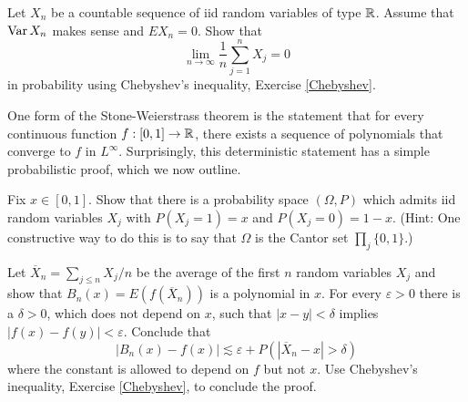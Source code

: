 \begin{exercise}
Let $X_n$ be a countable sequence of iid random variables of type $\mathbb{R}$.
Assume that $\operatorname{Var} X_n$ makes sense and $EX_n = 0$. Show that
$$\lim_{n \to \infty} \frac{1}{n} \sum_{j=1}^n X_j = 0$$
in probability using Chebyshev's inequality, Exercise \ref{Chebyshev}.
\end{exercise}

\begin{exercise}
One form of the Stone-Weierstrass theorem is the statement that for every continuous function $f: [0, 1] \to \mathbb{R}$, there exists a sequence of polynomials that converge to $f$ in $L^\infty$.
Surprisingly, this deterministic statement has a simple probabilistic proof, which we now outline.

Fix $x \in [0, 1]$.
Show that there is a probability space $(\Omega, P)$ which admits iid random variables $X_j$ with $P(X_j = 1) = x$ and $P(X_j = 0) = 1 - x$.
(Hint: One constructive way to do this is to say that $\Omega$ is the Cantor set $\prod_j \{0, 1\}$.)

Let $\overline X_n = \sum_{j \leq n} X_j/n$ be the average of the first $n$ random variables $X_j$ and show that $B_n(x) = E(f(\overline X_n))$ is a polynomial in $x$.
For every $\varepsilon > 0$ there is a $\delta > 0$, which does not depend on $x$, such that $|x - y| < \delta$ implies $|f(x) - f(y)| < \varepsilon$.
Conclude that
$$|B_n(x) - f(x)| \lesssim \varepsilon + P(|\overline X_n - x| > \delta)$$
where the constant is allowed to depend on $f$ but not $x$.
Use Chebyshev's inequality, Exercise \ref{Chebyshev}, to conclude the proof.
\end{exercise}

